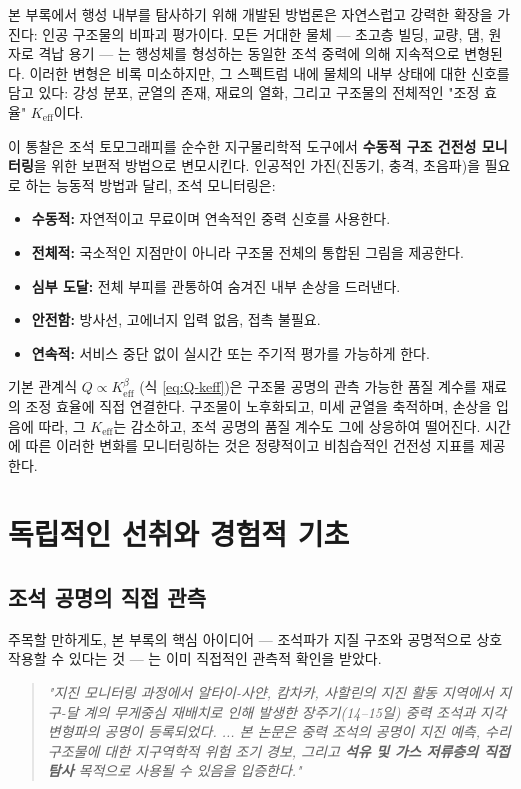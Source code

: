 \documentclass[12pt,a4paper]{article}
\theoremstyle{remark}
\begin{document}
	본 부록에서 행성 내부를 탐사하기 위해 개발된 방법론은 자연스럽고 강력한 확장을 가진다: 인공 구조물의 비파괴 평가이다. 모든 거대한 물체 — 초고층 빌딩, 교량, 댐, 원자로 격납 용기 — 는 행성체를 형성하는 동일한 조석 중력에 의해 지속적으로 변형된다. 이러한 변형은 비록 미소하지만, 그 스펙트럼 내에 물체의 내부 상태에 대한 신호를 담고 있다: 강성 분포, 균열의 존재, 재료의 열화, 그리고 구조물의 전체적인 "조정 효율" \(K_{\mathrm{eff}}\)이다.
	
	이 통찰은 조석 토모그래피를 순수한 지구물리학적 도구에서 \textbf{수동적 구조 건전성 모니터링}을 위한 보편적 방법으로 변모시킨다. 인공적인 가진(진동기, 충격, 초음파)을 필요로 하는 능동적 방법과 달리, 조석 모니터링은:
	\begin{itemize}
		\item \textbf{수동적:} 자연적이고 무료이며 연속적인 중력 신호를 사용한다.
		\item \textbf{전체적:} 국소적인 지점만이 아니라 구조물 전체의 통합된 그림을 제공한다.
		\item \textbf{심부 도달:} 전체 부피를 관통하여 숨겨진 내부 손상을 드러낸다.
		\item \textbf{안전함:} 방사선, 고에너지 입력 없음, 접촉 불필요.
		\item \textbf{연속적:} 서비스 중단 없이 실시간 또는 주기적 평가를 가능하게 한다.
	\end{itemize}
	
	기본 관계식 \(Q \propto K_{\mathrm{eff}}^{\beta}\) (식 \ref{eq:Q-keff})은 구조물 공명의 관측 가능한 품질 계수를 재료의 조정 효율에 직접 연결한다. 구조물이 노후화되고, 미세 균열을 축적하며, 손상을 입음에 따라, 그 \(K_{\mathrm{eff}}\)는 감소하고, 조석 공명의 품질 계수도 그에 상응하여 떨어진다. 시간에 따른 이러한 변화를 모니터링하는 것은 정량적이고 비침습적인 건전성 지표를 제공한다.
	
	\section{독립적인 선취와 경험적 기초}
	\label{sec:prior}
	
	\subsection{조석 공명의 직접 관측}
	
	주목할 만하게도, 본 부록의 핵심 아이디어 — 조석파가 지질 구조와 공명적으로 상호작용할 수 있다는 것 — 는 이미 직접적인 관측적 확인을 받았다.
	
	\begin{quotation}
		\noindent
		\textit{"지진 모니터링 과정에서 알타이-사얀, 캄차카, 사할린의 지진 활동 지역에서 지구-달 계의 무게중심 재배치로 인해 발생한 장주기(14–15일) 중력 조석과 지각 변형파의 공명이 등록되었다. ... 본 논문은 중력 조석의 공명이 지진 예측, 수리 구조물에 대한 지구역학적 위험 조기 경보, 그리고 \textbf{석유 및 가스 저류층의 직접 탐사} 목적으로 사용될 수 있음을 입증한다."} \cite{Sibgatulin2014}
	\end{quotation}
	
\end{document}
